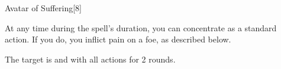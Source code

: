 \begin{spellsection}{Avatar of Suffering}[8]
    \begin{spellheader}
    \end{spellheader}
    \begin{spellcontent}
        \begin{spelltargetinginfo}
        \end{spelltargetinginfo}
        \begin{spelleffects}
            \spelleffect At any time during the spell's duration, you can concentrate as a standard action. If you do, you inflict pain on a foe, as described below.
            \spelldur \durlong
        \end{spelleffects}
    \end{spellcontent}
    \begin{spellsubcontent}
        \begin{spelltargetinginfo}
        \end{spelltargetinginfo}
        \begin{spelleffects}
            \spelleffect The target is \staggered and \impaired with all actions for 2 rounds.
        \end{spelleffects}
    \end{spellsubcontent}
    \begin{spellfooter}
        \miscastexplode
    \end{spellfooter}
    \begin{spellaugments}
    \end{spellaugments}
\end{spellsection}


